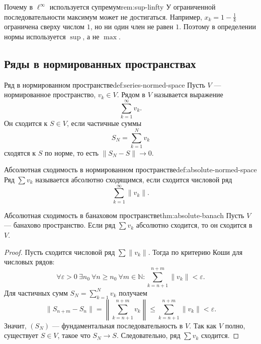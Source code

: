 \begin{Remark}{Почему в \(\ell^\infty\) используется супремум}{rem:sup-linfty}
	У ограниченной последовательности максимум может не достигаться. Например, \(x_k=1-\frac1k\) ограничена сверху числом \(1\), но ни один член не равен \(1\). Поэтому в определении нормы используется \(\sup\), а не \(\max\).
\end{Remark}

\subsection{Ряды в нормированных пространствах}

\begin{Definition}{Ряд в нормированном пространстве}{def:series-normed-space}
	Пусть \(V\) — нормированное пространство, \(v_k\in V\). Рядом в \(V\) называется выражение
	\[
	\sum_{k=1}^{\infty}v_k.
	\]
	Он сходится к \(S\in V\), если частичные суммы
	\[
	S_N=\sum_{k=1}^{N}v_k
	\]
	сходятся к \(S\) по норме, то есть \(\|S_N-S\|\to 0\).
\end{Definition}

\begin{Definition}{Абсолютная сходимость в нормированном пространстве}{def:absolute-normed-space}
	Ряд \(\sum v_k\) называется абсолютно сходящимся, если сходится числовой ряд
	\[
	\sum_{k=1}^{\infty}\|v_k\|.
	\]
\end{Definition}

\begin{Theorem}{Абсолютная сходимость в банаховом пространстве}{thm:absolute-banach}
	Пусть \(V\) — банахово пространство. Если ряд \(\sum v_k\) абсолютно сходится, то он сходится в \(V\).
\end{Theorem}

\begin{proof}
	Пусть сходится числовой ряд \(\sum \|v_k\|\). Тогда по критерию Коши для числовых рядов:
	\[
	\forall \varepsilon>0\ \exists n_0\ \forall n\ge n_0\ \forall m\in\mathbb N:
	\sum_{k=n+1}^{n+m}\|v_k\|<\varepsilon.
	\]
	Для частичных сумм \(S_N=\sum_{k=1}^{N}v_k\) получаем
	\[
	\|S_{n+m}-S_n\|
	=
	\left\|\sum_{k=n+1}^{n+m}v_k\right\|
	\le
	\sum_{k=n+1}^{n+m}\|v_k\|
	<\varepsilon.
	\]
	Значит, \((S_N)\) — фундаментальная последовательность в \(V\). Так как \(V\) полно, существует \(S\in V\), такое что \(S_N\to S\). Следовательно, ряд \(\sum v_k\) сходится.
\end{proof}